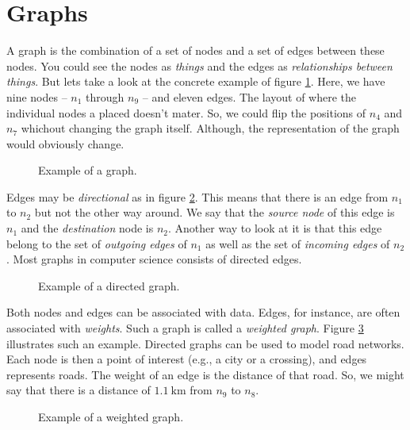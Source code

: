 \section{Graphs}

A graph is the combination of a set of nodes and a set of edges between these nodes. You could see the nodes as \textsl{things} and the edges as \textsl{relationships between things}. But lets take a look at the concrete example of figure \ref{fig:bs:graphs:graph}. Here, we have nine nodes -- $n_1$ through $n_9$ -- and eleven edges. The layout of where the individual nodes a placed doesn't mater. So, we could flip the positions of $n_4$ and $n_7$ whichout changing the graph itself. Although, the representation of the graph would obviously change.

\begin{figure}[tbp]
  
  \caption{Example of a graph.}
  \label{fig:bs:graphs:graph}
\end{figure}

Edges may be \textsl{directional} as in figure \ref{fig:bs:graphs:directed}. This means that there is an edge from $n_1$ to $n_2$ but not the other way around. We say that the \textsl{source node} of this edge is $n_1$ and the \textsl{destination} node is $n_2$. Another way to look at it is that this edge belong to the set of \textsl{outgoing edges} of $n_1$ as well as the set of \textsl{incoming edges} of $n_2$. Most graphs in computer science consists of directed edges.

\begin{figure}[tbp]
  
  \caption{Example of a directed graph.}
  \label{fig:bs:graphs:directed}
\end{figure}

Both nodes and edges can be associated with data. Edges, for instance, are often associated with \textsl{weights}. Such a graph is called a \textsl{weighted graph}. Figure \ref{fig:bs:graphs:weighted} illustrates such an example. Directed graphs can be used to model road networks. Each node is then a point of interest (e.g., a city or a crossing), and edges represents roads. The weight of an edge is the distance of that road. So, we might say that there is a distance of $1.1~\mathrm{km}$ from $n_9$ to $n_8$.

\begin{figure}[tbp]
  
  \caption{Example of a weighted graph.}
  \label{fig:bs:graphs:weighted}
\end{figure}

